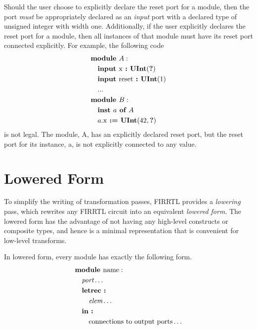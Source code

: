 \documentclass[12pt]{article}
\begin{document}
Should the user choose to explicitly declare the reset port for a module, then the port {\em must} be appropriately declared as an {\em input} port with a declared type of unsigned integer with width one.
Additionally, if the user explicitly declares the reset port for a module, then all instances of that module must have its reset port connected explicitly.
For example, the following code
\[
\begin{aligned}
&\kw{module} A :                               \\
&\quad \kw{input} \text{x} \kw{ :} \kws{UInt}(\kws{?})\\
&\quad \kw{input} \text{reset} \kw{ :} \kws{UInt}(1)\\
&\quad   ...                                   \\
&\kw{module} B :                               \\
&\quad \kw{inst} a \kw{ of} A                  \\
&\quad a.\text{x} \kw{ :=} \kws{UInt}(42, \kws{?})    \\
\end{aligned}
\]
is not legal.
The module, A, has an explicitly declared reset port, but the reset port for its instance, a, is not explicitly connected to any value.

\section{Lowered Form}

To simplify the writing of transformation passes, FIRRTL provides a {\em lowering} pass, which rewrites any FIRRTL circuit into an equivalent {\em lowered form}.
The lowered form has the advantage of not having any high-level constructs or composite types, and hence is a minimal representation that is convenient for low-level transforms. 

In lowered form, every module has exactly the following form.
\[
\begin{aligned}
&\text{\bf module\ } \text{name} :                                 \\
&\quad \text{\em port} \ldots                                   \\
&\quad \text{\bf letrec :\ }                                       \\
&\quad \quad \text{\em elem} \ldots                             \\
&\quad \text{\bf in :\ }                                           \\
&\quad \quad \text{connections to output ports} \ldots     \\
\end{aligned}
\]
\end{document}
